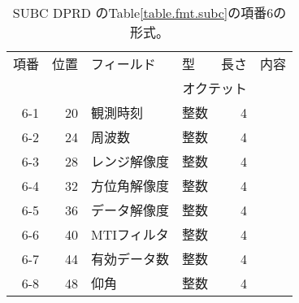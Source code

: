 \begin{table}[htp]
 \begin{center}
  \begin{tabular}{rr|llrl}
 \hline
 項番 & 位置 & フィールド & 型 & 長さ & 内容 \\
      &      &            & \multicolumn{2}{r}{オクテット} &  \\
 \hline
   6-1 & 20 & 観測時刻 & 整数  & 4 & \\
   6-2 & 24 & 周波数 & 整数 & 4 & \\
   6-3 & 28 & レンジ解像度 & 整数 & 4 & \\
   6-4 & 32 & 方位角解像度 & 整数 & 4 & \\
   6-5 & 36 & データ解像度 & 整数 & 4 & \\
   6-6 & 40 & MTIフィルタ & 整数 & 4 & \\
   6-7 & 44 & 有効データ数 & 整数 & 4 &  \\
   6-8 & 48 & 仰角 & 整数 & 4 &  \\
   \hline
  \end{tabular}
 \end{center}
 \caption{SUBC DPRD のTable\ref{table.fmt.subc}の項番6の形式。}
 \label{table.fmt.subc.dprd}
\end{table}


